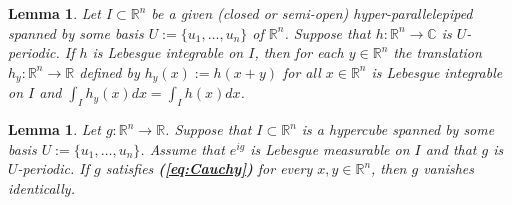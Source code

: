 \documentclass[12 pt]{amsart}
\newtheorem{lem}[thm]{Lemma}
\theoremstyle{definition}
\newcommand{\R}{\mathbb{R}}
\newcommand{\C}{\mathbb{C}}
\newcommand{\beqref}[1]{\textbf{(\ref{#1})}} %
\begin{document}
\begin{lem}\label{lem:period2}
Let $I\subset \R^n$ be a given (closed or semi-open) hyper-parallelepiped spanned by some basis $U:=\{u_1,\ldots,u_n\}$ of $\R^n$. Suppose that $h:\R^n \to \C$ is $U$-periodic. If $h$ is Lebesgue integrable on $I$, then for each $y\in \R^n$ the translation $h_y:\R^n\to\R$ defined by $h_y(x):=h(x+y)$ for all $x\in\R^n$ is Lebesgue integrable on $I$ and $\int_I h_y(x)dx=\int_I h(x)dx$. 
\end{lem}

\begin{lem}\label{lem:UniqueRn}
Let $g:\R^n\to \R$. Suppose that $I\subset \R^n$ is a hypercube spanned by some basis $U:=\{u_1,\ldots,u_n\}$. Assume that $e^{ig}$ is Lebesgue measurable on $I$ and that $g$ is $U$-periodic. If $g$ satisfies \beqref{eq:Cauchy} for every $x,y\in\R^n$, then $g$ vanishes identically.
\end{lem}
\end{document}
